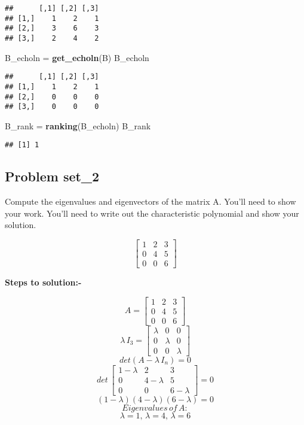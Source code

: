 \documentclass[]{article}
\newenvironment{Shaded}{\begin{snugshade}}{\end{snugshade}}
\newcommand{\KeywordTok}[1]{\textcolor[rgb]{0.13,0.29,0.53}{\textbf{#1}}}
\newcommand{\NormalTok}[1]{#1}
\newcommand{\StringTok}[1]{\textcolor[rgb]{0.31,0.60,0.02}{#1}}
\begin{document}
\begin{verbatim}
##      [,1] [,2] [,3]
## [1,]    1    2    1
## [2,]    3    6    3
## [3,]    2    4    2
\end{verbatim}

\begin{Shaded}
\begin{Highlighting}[]
\NormalTok{B_echoln =}\StringTok{ }\KeywordTok{get_echoln}\NormalTok{(B)}
\NormalTok{B_echoln}
\end{Highlighting}
\end{Shaded}

\begin{verbatim}
##      [,1] [,2] [,3]
## [1,]    1    2    1
## [2,]    0    0    0
## [3,]    0    0    0
\end{verbatim}

\begin{Shaded}
\begin{Highlighting}[]
\NormalTok{B_rank =}\StringTok{ }\KeywordTok{ranking}\NormalTok{(B_echoln)}
\NormalTok{B_rank}
\end{Highlighting}
\end{Shaded}

\begin{verbatim}
## [1] 1
\end{verbatim}

\hypertarget{problem-set_2}{%
\subsection{Problem set\_2}\label{problem-set_2}}

Compute the eigenvalues and eigenvectors of the matrix A. You'll need to
show your work. You'll need to write out the characteristic polynomial
and show your solution.

\[\begin{bmatrix} 1 & 2 & 3 \\ 0 & 4 & 5 \\ 0 & 0 & 6 \end{bmatrix}\]

\textbf{Steps to solution:-}

\[ A = \begin{bmatrix}1 & 2 & 3 \\0 & 4 & 5 \\0 & 0 & 6 \end{bmatrix}\]
\[ \lambda\,I_3 = \begin{bmatrix}\lambda & 0 & 0 \\0 & \lambda & 0 \\0 & 0 & \lambda \end{bmatrix}\]
\[ det(A-\lambda\,I_n)=0\]
\[ det\,\begin{bmatrix}1-\lambda & 2 & 3 \\0 & 4-\lambda & 5 \\0 & 0 & 6-\lambda \end{bmatrix} = 0\]
\[(1-\lambda)(4-\lambda)(6-\lambda)=0\] \[ Eigenvalues\,of\,A:\]
\[\lambda=1,\, \lambda=4,\, \lambda=6\]
\end{document}
